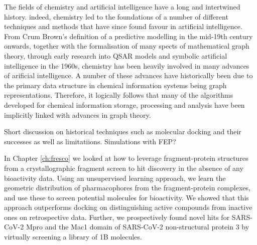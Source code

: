 The fields of chemistry and artificial intelligence have a long and intertwined history. indeed, chemistry led to the foundations of a number of different techniques and methods that have since found favour in artificial intelligence. From Crum Brown's definition of a predictive modelling in the mid-19th century onwards, together with the formalisation of many spects of mathematical graph theory, through early research into QSAR models and symbolic artificial intelligence in the 1960s, chemistry has been heavily involved in many advances of arificial intelligence. A number of these advances have historically been due to the primary data structure in chemical information systems being graph representations. Therefore, it logically follows that many of the algorithms developed for chemical information storage, processing and analysis have been implicitly linked with advances in graph theory.



Short discussion on historical techniques such as molecular docking and their successes as well as limitatiions. Simulations with FEP?

In Chapter \ref{ch:fresco} we looked at how to leverage fragment-protein structures from a crystallographic fragment screen to hit discovery in the absence of any bioactivity data. Using an unsupervised learning approach, we learn the geometric distribution of pharmacophores from the fragment-protein complexes, and use these to screen potential molecules for bioactivity. We showed that this approach outperforms docking on distinguishing active compounds from inactive ones on retrospective data. Further, we prospectively found novel hits for SARS-CoV-2 Mpro and the Mac1 domain of SARS-CoV-2 non-structural protein 3 by virtually screening a library of 1B molecules.

